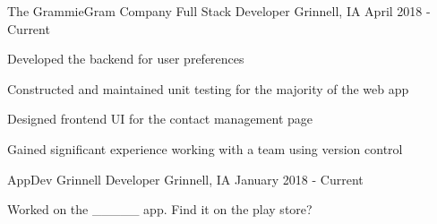 \begin{cventries}
  \cventry
    {The GrammieGram Company}
    {Full Stack Developer}
    {Grinnell, IA}
    {April 2018 - Current}
    {
      \begin{cvitems}
        \item {Developed the backend for user preferences}
        \item {Constructed and maintained unit testing for the majority of the web app}
        \item {Designed frontend UI for the contact management page}
        \item {Gained significant experience working with a team using version control}
      \end{cvitems}
    }

  \cventry
    {AppDev Grinnell}
    {Developer}
    {Grinnell, IA}
    {January 2018 - Current}
    {
      \begin{cvitems}
        \item {Worked on the _____ app. Find it on the play store?}
      \end{cvitems}
    }

\end{cventries}
